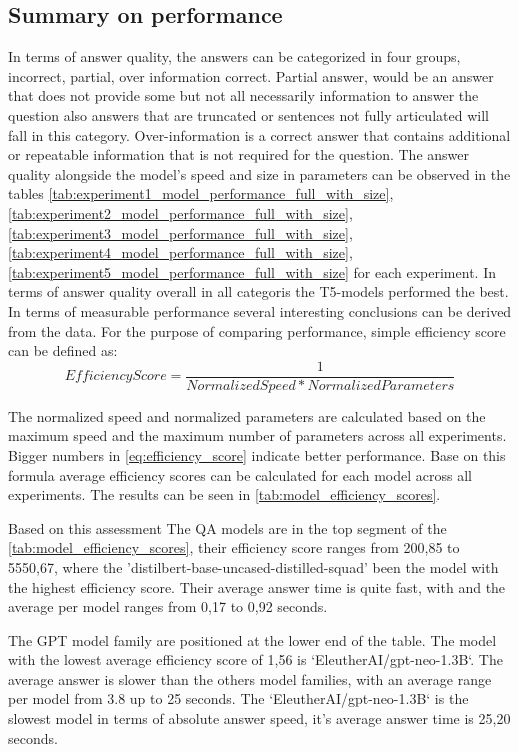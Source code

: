 \documentclass{wseas}
\begin{document}
\subsection{Summary on performance}
In terms of answer quality, the answers can be categorized in four groups, incorrect, partial, over information correct.
Partial answer, would be an answer that does not provide some but not all necessarily information to answer the question
also answers that are truncated or sentences not fully articulated will fall in this category. Over-information
is a correct answer that contains additional or repeatable information that is not required for the question. 
The answer quality alongside the model's speed and size in parameters can be observed in the tables 
\autoref{tab:experiment1_model_performance_full_with_size}, \autoref{tab:experiment2_model_performance_full_with_size}, 
\autoref{tab:experiment3_model_performance_full_with_size}, \autoref{tab:experiment4_model_performance_full_with_size},
\autoref{tab:experiment5_model_performance_full_with_size} for each experiment. In terms of answer quality overall in all categoris
the T5-models performed the best. In terms of measurable performance several interesting conclusions can be derived from the data. 
For the purpose of comparing performance, simple efficiency score can be defined as:
\begin{equation}
  Efficiency Score = \frac{1}{Normalized Speed * Normalized Parameters}
  \label{eq:efficiency_score}
\end{equation}

The normalized speed and normalized parameters are calculated based on the maximum speed and the maximum number of parameters across all experiments.
Bigger numbers in \autoref{eq:efficiency_score} indicate better performance. Base on this formula average efficiency scores 
can be calculated for each model across all experiments. The results can be seen in \autoref{tab:model_efficiency_scores}.

Based on this assessment The QA models are in the top segment of the \autoref{tab:model_efficiency_scores},
their efficiency score ranges from 200,85 to 5550,67, where the 'distilbert-base-uncased-distilled-squad' been the model with the highest efficiency score.
Their average answer time is quite fast, with and the average per model ranges from 0,17 to 0,92 seconds.

The GPT model family are positioned at the lower end of the table. The model with the lowest average efficiency score
of 1,56 is `EleutherAI/gpt-neo-1.3B`. The average answer is slower than the others model families, with an average range per model from 3.8 up to 25 seconds.
The `EleutherAI/gpt-neo-1.3B` is the slowest model in terms of absolute answer speed, it's average answer time is 25,20 seconds.
\end{document}
